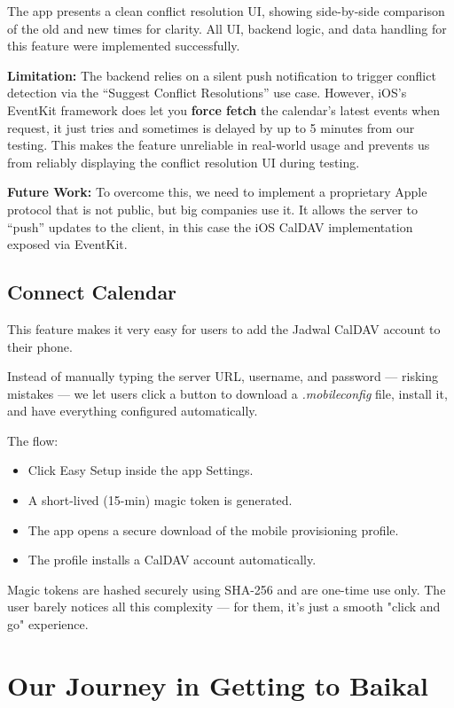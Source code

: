 The app presents a clean conflict resolution UI, showing side-by-side comparison of the old and new times for clarity. All UI, backend logic, and data handling for this feature were implemented successfully.

\textbf{Limitation:} The backend relies on a silent push notification to trigger conflict detection via the “Suggest Conflict Resolutions” use case. However, iOS's EventKit framework does let you \textbf{force fetch} the calendar's latest events when request, it just tries and sometimes is delayed by up to 5 minutes from our testing. This makes the feature unreliable in real-world usage and prevents us from reliably displaying the conflict resolution UI during testing.

\textbf{Future Work:} To overcome this, we need to implement a proprietary Apple protocol that is not public, but big companies use it. It allows the server to ``push'' updates to the client, in this case the iOS CalDAV implementation exposed via EventKit.

\subsection{Connect Calendar} \label{subsec:connect-calendar}

This feature makes it very easy for users to add the Jadwal CalDAV account to their phone.

Instead of manually typing the server URL, username, and password — risking mistakes — we let users click a button to download a \textit{.mobileconfig} file, install it, and have everything configured automatically.

The flow:

\begin{itemize}
    \item Click Easy Setup inside the app Settings.
    \item A short-lived (15-min) magic token is generated.
    \item The app opens a secure download of the mobile provisioning profile.
    \item The profile installs a CalDAV account automatically.
\end{itemize}

Magic tokens are hashed securely using SHA-256 and are one-time use only. The user barely notices all this complexity — for them, it’s just a smooth "click and go" experience.

\section{Our Journey in Getting to Baikal}

